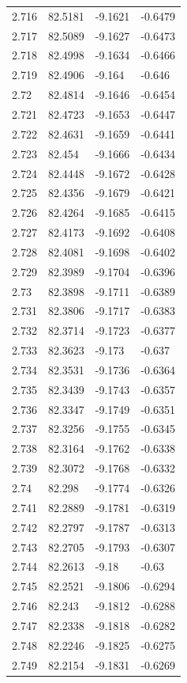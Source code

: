 \begin{tabular}{llll}
2.716 & 82.5181 & -9.1621 & -0.6479 \\
2.717 & 82.5089 & -9.1627 & -0.6473 \\
2.718 & 82.4998 & -9.1634 & -0.6466 \\
2.719 & 82.4906 & -9.164 & -0.646 \\
2.72 & 82.4814 & -9.1646 & -0.6454 \\
2.721 & 82.4723 & -9.1653 & -0.6447 \\
2.722 & 82.4631 & -9.1659 & -0.6441 \\
2.723 & 82.454 & -9.1666 & -0.6434 \\
2.724 & 82.4448 & -9.1672 & -0.6428 \\
2.725 & 82.4356 & -9.1679 & -0.6421 \\
2.726 & 82.4264 & -9.1685 & -0.6415 \\
2.727 & 82.4173 & -9.1692 & -0.6408 \\
2.728 & 82.4081 & -9.1698 & -0.6402 \\
2.729 & 82.3989 & -9.1704 & -0.6396 \\
2.73 & 82.3898 & -9.1711 & -0.6389 \\
2.731 & 82.3806 & -9.1717 & -0.6383 \\
2.732 & 82.3714 & -9.1723 & -0.6377 \\
2.733 & 82.3623 & -9.173 & -0.637 \\
2.734 & 82.3531 & -9.1736 & -0.6364 \\
2.735 & 82.3439 & -9.1743 & -0.6357 \\
2.736 & 82.3347 & -9.1749 & -0.6351 \\
2.737 & 82.3256 & -9.1755 & -0.6345 \\
2.738 & 82.3164 & -9.1762 & -0.6338 \\
2.739 & 82.3072 & -9.1768 & -0.6332 \\
2.74 & 82.298 & -9.1774 & -0.6326 \\
2.741 & 82.2889 & -9.1781 & -0.6319 \\
2.742 & 82.2797 & -9.1787 & -0.6313 \\
2.743 & 82.2705 & -9.1793 & -0.6307 \\
2.744 & 82.2613 & -9.18 & -0.63 \\
2.745 & 82.2521 & -9.1806 & -0.6294 \\
2.746 & 82.243 & -9.1812 & -0.6288 \\
2.747 & 82.2338 & -9.1818 & -0.6282 \\
2.748 & 82.2246 & -9.1825 & -0.6275 \\
2.749 & 82.2154 & -9.1831 & -0.6269 \\

\end{tabular}
